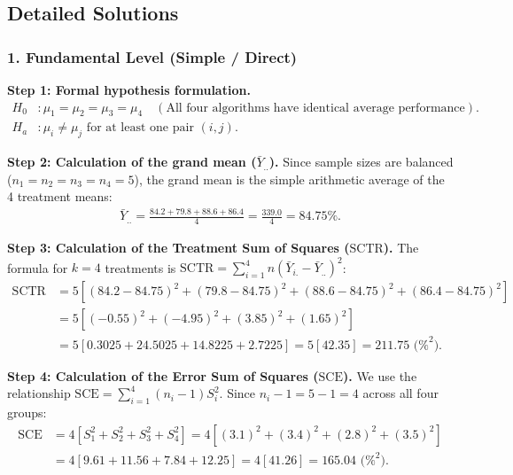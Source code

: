 \subsection{Detailed Solutions}

\subsubsection*{1. Fundamental Level (Simple / Direct)}

\begin{solproblema}
	\textbf{Step 1: Formal hypothesis formulation.}
	\begin{align}
		H_0&: \mu_1 = \mu_2 = \mu_3 = \mu_4 \quad (\text{All four algorithms have identical average performance}). \\
		H_a&: \mu_i \neq \mu_j \text{ for at least one pair } (i, j).
	\end{align}
	
	\textbf{Step 2: Calculation of the grand mean ($\bar{Y}_{..}$).}
	Since sample sizes are balanced ($n_1 = n_2 = n_3 = n_4 = 5$), the grand mean is the simple arithmetic average of the 4 treatment means:
	\begin{align}
		\bar{Y}_{..} = \frac{84.2 + 79.8 + 88.6 + 86.4}{4} = \frac{339.0}{4} = 84.75\%.
	\end{align}
	
	\textbf{Step 3: Calculation of the Treatment Sum of Squares ($\text{SCTR}$).}
	The formula for $k = 4$ treatments is $\text{SCTR} = \sum_{i=1}^4 n (\bar{Y}_{i.} - \bar{Y}_{..})^2$:
	\begin{align}
		\text{SCTR} &= 5 \left[ (84.2 - 84.75)^2 + (79.8 - 84.75)^2 + (88.6 - 84.75)^2 + (86.4 - 84.75)^2 \right] \\
		&= 5 \left[ (-0.55)^2 + (-4.95)^2 + (3.85)^2 + (1.65)^2 \right] \\
		&= 5 \left[ 0.3025 + 24.5025 + 14.8225 + 2.7225 \right] = 5 \left[ 42.35 \right] = 211.75 \text{ (\%}^2\text{)}.
	\end{align}
	
	\textbf{Step 4: Calculation of the Error Sum of Squares ($\text{SCE}$).}
	We use the relationship $\text{SCE} = \sum_{i=1}^4 (n_i - 1)S_i^2$. Since $n_i - 1 = 5 - 1 = 4$ across all four groups:
	\begin{align}
		\text{SCE} &= 4 \left[ S_1^2 + S_2^2 + S_3^2 + S_4^2 \right] = 4 \left[ (3.1)^2 + (3.4)^2 + (2.8)^2 + (3.5)^2 \right] \\
		&= 4 \left[ 9.61 + 11.56 + 7.84 + 12.25 \right] = 4 \left[ 41.26 \right] = 165.04 \text{ (\%}^2\text{)}.
	\end{align}
	

\end{solproblema}

